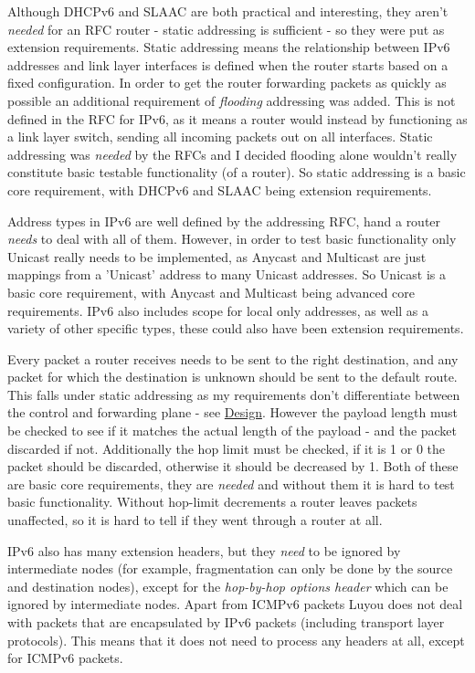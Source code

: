\documentclass[12pt,a4paper,twoside,openright]{report}
\begin{document}
Although DHCPv6 and SLAAC are both practical and interesting, they aren't \textit{needed} for an RFC router - static addressing is sufficient - so they were put as extension requirements.  Static addressing means the relationship between IPv6 addresses and link layer interfaces is defined when the router starts based on a fixed configuration. In order to get the router forwarding packets as quickly as possible an additional requirement of \textit{flooding} addressing was added.  This is not defined in the RFC for IPv6, as it means a router would instead by functioning as a link layer switch, sending all incoming packets out on all interfaces. Static addressing was \textit{needed} by the RFCs and I decided flooding alone wouldn't really constitute basic testable functionality (of a router). So static addressing is a basic core requirement, with DHCPv6 and SLAAC being extension requirements.

Address types in IPv6 are well defined by the addressing RFC\cite{ipv6_rfc_adr}, hand a router \textit{needs} to deal with all of them.  However, in order to test basic functionality only Unicast really needs to be implemented, as Anycast and Multicast are just mappings from a 'Unicast' address to many Unicast addresses. So Unicast is a basic core requirement, with Anycast and Multicast being advanced core requirements. IPv6 also includes scope for local only addresses, as well as a variety of other specific types, these could also have been extension requirements.

\bigskip

Every packet a router receives needs to be sent to the right destination, and any packet for which the destination is unknown should be sent to the default route. This falls under static addressing as my requirements don't differentiate between the control and forwarding plane - see \hyperref[sec::design]{Design}.  However the payload length must be checked to see if it matches the actual length of the payload - and the packet discarded if not.  Additionally the hop limit must be checked, if it is 1 or 0 the packet should be discarded, otherwise it should be decreased by 1.  Both of these are basic core requirements, they are \textit{needed} and without them it is hard to test basic functionality. Without hop-limit decrements a router leaves packets unaffected, so it is hard to tell if they went through a router at all.

IPv6 also has many extension headers, but they \textit{need} to be ignored by intermediate nodes (for example, fragmentation can only be done by the source and destination nodes), except for the \textit{hop-by-hop options header} which can be ignored by intermediate nodes. Apart from ICMPv6 packets Luyou does not deal with packets that are encapsulated by IPv6 packets (including transport layer protocols).  This means that it does not need to process any headers at all, except for ICMPv6 packets.
\end{document}
